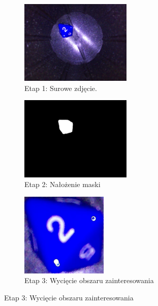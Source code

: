 \begin{figure}[H]
    \centering
    \begin{subfigure}[t]{0.32\linewidth}
        \centering
        \includegraphics[height=4cm]{chapters/04-czytanie/figures/2_1}
        \caption{Etap 1: Surowe zdjęcie.}
        \label{fig:step1}
    \end{subfigure}
    \hspace{-0.5em}
    \begin{subfigure}[t]{0.32\linewidth}
        \centering
        \includegraphics[height=4cm]{chapters/04-czytanie/figures/2_2}
        \caption{Etap 2: Nałożenie maski}
        \label{fig:step2}
    \end{subfigure}
    \hspace{-0.5em}
    \begin{subfigure}[t]{0.32\linewidth}
        \centering
        \includegraphics[height=4cm]{chapters/04-czytanie/figures/2_3}
        \caption{Etap 3: Wycięcie obszaru zainteresowania}
        \label{fig:step3}
    \end{subfigure}

    \vspace{0.3cm}


\end{figure}

